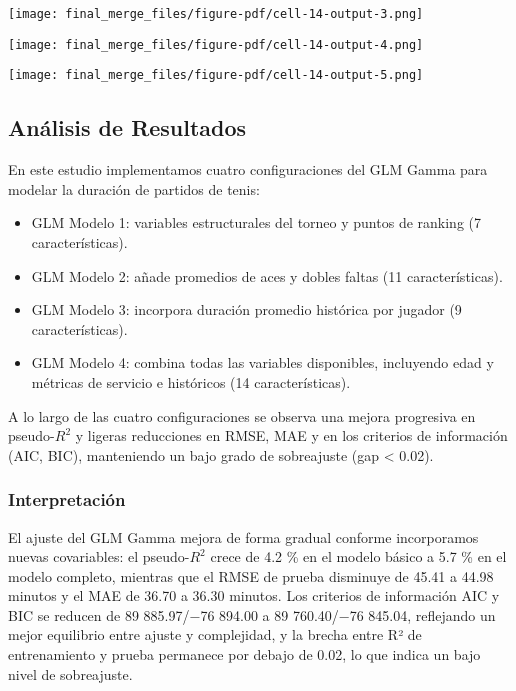 \documentclass[
  letterpaper,
  DIV=11,
  numbers=noendperiod]{scrartcl}
\providecommand{\tightlist}{%
  \setlength{\itemsep}{0pt}\setlength{\parskip}{0pt}}\usepackage{longtable,booktabs,array}
\begin{document}
\texttt{[image: final\_merge\_files/figure-pdf/cell-14-output-3.png]}

\texttt{[image: final\_merge\_files/figure-pdf/cell-14-output-4.png]}

\texttt{[image: final\_merge\_files/figure-pdf/cell-14-output-5.png]}

\hypertarget{anuxe1lisis-de-resultados-2}{%
\subsection{Análisis de Resultados}\label{anuxe1lisis-de-resultados-2}}

En este estudio implementamos cuatro configuraciones del GLM Gamma para
modelar la duración de partidos de tenis:

\begin{itemize}
\tightlist
\item
  GLM Modelo 1: variables estructurales del torneo y puntos de ranking
  (7 características).\\
\item
  GLM Modelo 2: añade promedios de aces y dobles faltas (11
  características).\\
\item
  GLM Modelo 3: incorpora duración promedio histórica por jugador (9
  características).\\
\item
  GLM Modelo 4: combina todas las variables disponibles, incluyendo edad
  y métricas de servicio e históricos (14 características).
\end{itemize}

A lo largo de las cuatro configuraciones se observa una mejora
progresiva en pseudo-\(R^2\) y ligeras reducciones en RMSE, MAE y en los
criterios de información (AIC, BIC), manteniendo un bajo grado de
sobreajuste (gap \textless{} 0.02).

\hypertarget{interpretaciuxf3n-1}{%
\subsubsection{Interpretación}\label{interpretaciuxf3n-1}}

El ajuste del GLM Gamma mejora de forma gradual conforme incorporamos
nuevas covariables: el pseudo-\(R^2\) crece de 4.2 \% en el modelo
básico a 5.7 \% en el modelo completo, mientras que el RMSE de prueba
disminuye de 45.41 a 44.98 minutos y el MAE de 36.70 a 36.30 minutos.
Los criterios de información AIC y BIC se reducen de 89 885.97/−76
894.00 a 89 760.40/−76 845.04, reflejando un mejor equilibrio entre
ajuste y complejidad, y la brecha entre R² de entrenamiento y prueba
permanece por debajo de 0.02, lo que indica un bajo nivel de
sobreajuste.
\end{document}
